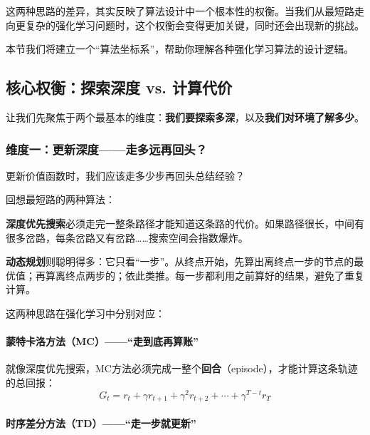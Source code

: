 这两种思路的差异，其实反映了算法设计中一个根本性的权衡。当我们从最短路走向更复杂的强化学习问题时，这个权衡会变得更加关键，同时还会出现新的挑战。

本节我们将建立一个“算法坐标系”，帮助你理解各种强化学习算法的设计逻辑。

\subsection{核心权衡：探索深度 vs. 计算代价}

让我们先聚焦于两个最基本的维度：\textbf{我们要探索多深}，以及\textbf{我们对环境了解多少}。

\subsubsection{维度一：更新深度——走多远再回头？}

\begin{keyidea}[核心问题]
更新价值函数时，我们应该走多少步再回头总结经验？
\end{keyidea}

回想最短路的两种算法：

\textbf{深度优先搜索}必须走完一整条路径才能知道这条路的代价。如果路径很长，中间有很多岔路，每条岔路又有岔路……搜索空间会指数爆炸。

\textbf{动态规划}则聪明得多：它只看“一步”。从终点开始，先算出离终点一步的节点的最优值；再算离终点两步的；依此类推。每一步都利用之前算好的结果，避免了重复计算。

这两种思路在强化学习中分别对应：

\paragraph{蒙特卡洛方法（MC）——“走到底再算账”}

就像深度优先搜索，MC方法必须完成一整个\textbf{回合}（episode），才能计算这条轨迹的总回报：
\begin{equation}
    G_t = r_t + \gamma r_{t+1} + \gamma^2 r_{t+2} + \cdots + \gamma^{T-t} r_T
\end{equation}

\paragraph{时序差分方法（TD）——“走一步就更新”}


